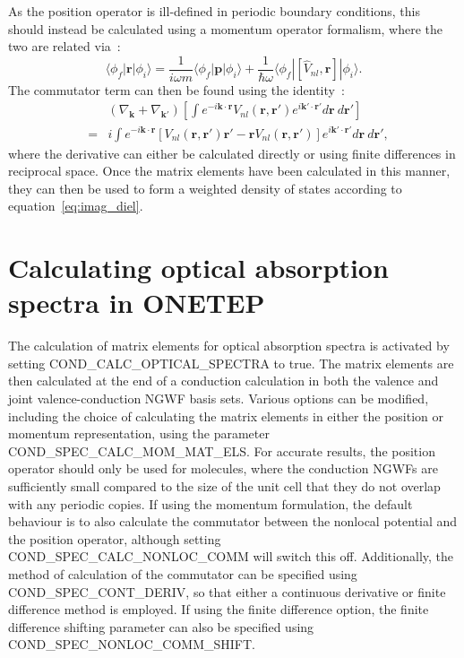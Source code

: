 \documentclass[a4paper,oneside,11pt]{article}
\begin{document}
As the position operator is ill-defined in periodic boundary conditions, this should instead be calculated using a momentum operator formalism, where the two are related via~\cite{read}:
%
\begin{equation}
\langle\phi_f|\mathbf{r}|\phi_i\rangle = \frac{1}{i\omega m}\langle\phi_f|\mathbf{p}|\phi_i\rangle + \frac{1}{\hbar\omega}\langle\phi_f|\left[\hat{V}_{nl},\mathbf{r}\right]|\phi_i\rangle .
\end{equation}
%
The commutator term can then be found using the identity~\cite{motta}:
%
\begin{eqnarray}
&&\left(\nabla_\mathbf{k}+\nabla_\mathbf{k'}\right)\left[\int e^{-i\mathbf{k}\cdot\mathbf{r}} V_{nl}\left(\mathbf{r},\mathbf{r'}\right) e^{i\mathbf{k'}\cdot\mathbf{r'}} d\mathbf{r}\ d\mathbf{r'}\right] \\
&=&i\int e^{-i\mathbf{k}\cdot\mathbf{r}}\left[V_{nl}\left(\mathbf{r},\mathbf{r'}\right)\mathbf{r'}-\mathbf{r}V_{nl}\left(\mathbf{r},\mathbf{r'}\right)\right] e^{i\mathbf{k'}\cdot\mathbf{r'}} d\mathbf{r}\ d\mathbf{r'} \nonumber,
\end{eqnarray}
%
where the derivative can either be calculated directly or using finite differences in reciprocal space.  Once the matrix elements have been calculated in this manner, they can then be used to form a weighted density of states according to equation~\ref{eq:imag_diel}.  

\section*{Calculating optical absorption spectra in ONETEP}

The calculation of matrix elements for optical absorption spectra is activated by setting COND\_CALC\_OPTICAL\_SPECTRA to true.  The matrix elements are then calculated at the end of a conduction calculation in both the valence and joint valence-conduction NGWF basis sets.  Various options can be modified, including the choice of calculating the matrix elements in either the position or momentum representation, using the parameter COND\_SPEC\_CALC\_MOM\_MAT\_ELS.  For accurate results, the position operator should only be used for molecules, where the conduction NGWFs are sufficiently small compared to the size of the unit cell that they do not overlap with any periodic copies.  If using the momentum formulation, the default behaviour is to also calculate the commutator between the nonlocal potential and the position operator, although setting COND\_SPEC\_CALC\_NONLOC\_COMM will switch this off.  Additionally, the method of calculation of the commutator can be specified using COND\_SPEC\_CONT\_DERIV, so that either a continuous derivative or finite difference method is employed.  If using the finite difference option, the finite difference shifting parameter can also be specified using COND\_SPEC\_NONLOC\_COMM\_SHIFT.
\end{document}
